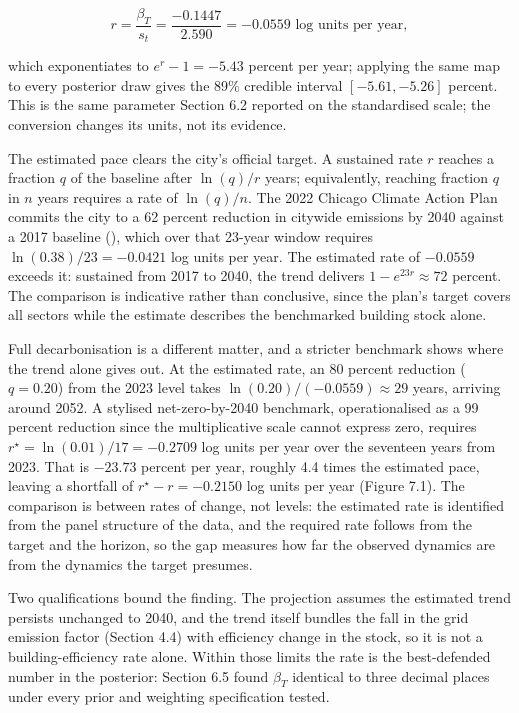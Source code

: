 \[
r = \frac{\beta_T}{s_t} = \frac{-0.1447}{2.590} = -0.0559 \text{ log units per year},
\]

which exponentiates to $e^r - 1 = -5.43$ percent per year; applying the same map to every posterior draw gives the 89\% credible interval $[-5.61, -5.26]$ percent. This is the same parameter Section 6.2 reported on the standardised scale; the conversion changes its units, not its evidence.

The estimated pace clears the city's official target. A sustained rate $r$ reaches a fraction $q$ of the baseline after $\ln(q)/r$ years; equivalently, reaching fraction $q$ in $n$ years requires a rate of $\ln(q)/n$. The 2022 Chicago Climate Action Plan commits the city to a 62 percent reduction in citywide emissions by 2040 against a 2017 baseline (), which over that 23-year window requires $\ln(0.38)/23 = -0.0421$ log units per year. The estimated rate of $-0.0559$ exceeds it: sustained from 2017 to 2040, the trend delivers $1 - e^{23r} \approx 72$ percent. The comparison is indicative rather than conclusive, since the plan's target covers all sectors while the estimate describes the benchmarked building stock alone.

Full decarbonisation is a different matter, and a stricter benchmark shows where the trend alone gives out. At the estimated rate, an 80 percent reduction ($q = 0.20$) from the 2023 level takes $\ln(0.20)/(-0.0559) \approx 29$ years, arriving around 2052. A stylised net-zero-by-2040 benchmark, operationalised as a 99 percent reduction since the multiplicative scale cannot express zero, requires $r^\star = \ln(0.01)/17 = -0.2709$ log units per year over the seventeen years from 2023. That is $-23.73$ percent per year, roughly 4.4 times the estimated pace, leaving a shortfall of $r^\star - r = -0.2150$ log units per year (Figure 7.1). The comparison is between rates of change, not levels: the estimated rate is identified from the panel structure of the data, and the required rate follows from the target and the horizon, so the gap measures how far the observed dynamics are from the dynamics the target presumes.

Two qualifications bound the finding. The projection assumes the estimated trend persists unchanged to 2040, and the trend itself bundles the fall in the grid emission factor (Section 4.4) with efficiency change in the stock, so it is not a building-efficiency rate alone. Within those limits the rate is the best-defended number in the posterior: Section 6.5 found $\beta_T$ identical to three decimal places under every prior and weighting specification tested.

